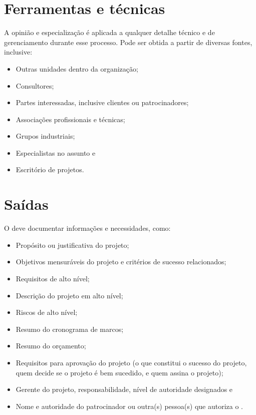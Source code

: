\section{Ferramentas e técnicas}

A opinião e especialização é aplicada a qualquer detalhe técnico e de gerenciamento durante esse processo. Pode ser obtida a partir de diversas fontes, inclusive: 

\begin{itemize}
	\item Outras unidades dentro da organização;
	\item Consultores;
	\item Partes interessadas, inclusive clientes ou patrocinadores;
	\item Associações profissionais e técnicas;
	\item Grupos industriais;
	\item Especialistas no assunto e
	\item Escritório de projetos.
\end{itemize}

\section{Saídas}

O \termo deve documentar informações e necessidades, como:

\begin{itemize}
	
 	\item Propósito ou justificativa do projeto;
	
	\item Objetivos mensuráveis do projeto e critérios de sucesso relacionados;
	
	\item Requisitos de alto nível;
	
	\item Descrição do projeto em alto nível;
	
	\item Riscos de alto nível;
	
	\item Resumo do cronograma de marcos;
	
	\item Resumo do orçamento;
	
	\item Requisitos para aprovação do projeto (o que constitui o sucesso do projeto, quem decide se o projeto é bem sucedido, e quem assina o projeto);
	
	\item Gerente do projeto, responsabilidade, nível de autoridade designados e
		
	\item Nome e autoridade do patrocinador ou outra(s) pessoa(s) que autoriza o \termo.
	
\end{itemize}
 
